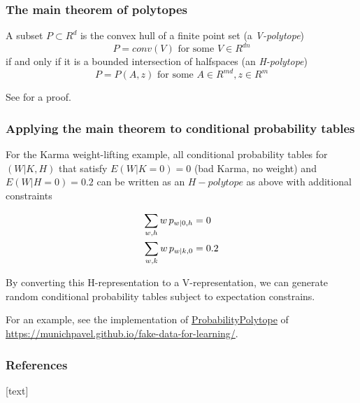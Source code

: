 \begin{frame}
\frametitle{The main theorem of polytopes}

\begin{theorem}
  A subset $P \subset R^d$ is the convex hull of a finite point set (a \emph{V-polytope}) 
  \begin{equation*}
    P = conv(V) \textrm{ for some }V \in R^{dn}
  \end{equation*}
if and only if it is a bounded intersection of halfspaces (an \emph{H-polytope}) 
\begin{equation*}
  P = P(A,z) \textrm{ for some }A \in R^{md}, z \in R^m
\end{equation*}
\end{theorem}

See \cite{ziegler2012lectures} for a proof.\newline
\end{frame}


\begin{frame}
  \frametitle{Applying the main theorem to conditional probability tables}
For the Karma weight-lifting example, all conditional probability tables for $(W | K, H)$ that satisfy $E(W | K = 0) = 0$ (bad Karma, no weight) and $E(W | H = 0)=0.2$ can be written as an $H-polytope$ as above with additional constraints

\begin{align*}
\sum_{w, h} w \, p_{w | 0, h} &= 0\\
\sum_{w, k} w \, p_{w | k, 0} & = 0.2\newline
\end{align*}

By converting this H-representation to a V-representation, we can generate random conditional probability tables subject to expectation constrains.\newline

For an example, see the implementation of \href{https://munichpavel.github.io/fake-data-docs/html/\_modules/fake\_data\_for\_learning/utils.html\#ProbabilityPolytope}{ProbabilityPolytope} of \href{https://munichpavel.github.io/fake-data-for-learning/}{https://munichpavel.github.io/fake-data-for-learning/}.

\end{frame}


\begin{frame}[allowframebreaks]
    \frametitle{References}
    [text]
    
    
\end{frame}

